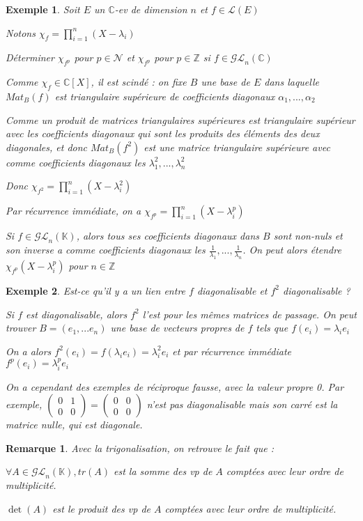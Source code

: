\documentclass[a4paper,12pt]{book}
\newtheorem{Exe}{Exemple}[section]
\newtheorem{Rem}{Remarque}[section]
\def\C{\mathbb{C}}
\def\Z{\mathbb{Z}}
\def\K{\mathbb{K}}
\begin{document}
\begin{Exe}
Soit $E$ un $\C$-ev de dimension $n$ et $f\in\mathcal{L}(E)$ \par Notons $\chi_f = \prod\limits_{i=1}^n (X-\lambda_i)$ \par Déterminer $\chi_{f^p}$ pour $p\in\mathcal{N}$ et $\chi_{f^p}$ pour $p\in\Z$ si $f\in\mathcal{GL}_n(\C)$ \par Comme $\chi_f\in\C[X]$, il est scindé : on fixe $B$ une base de $E$ dans laquelle $Mat_B(f)$ est triangulaire supérieure de coefficients diagonaux $\alpha_1,...,\alpha_2$ \par Comme un produit de matrices triangulaires supérieures est triangulaire supérieur avec les coefficients diagonaux qui sont les produits des éléments des deux diagonales, et donc $Mat_B(f^2)$ est une matrice triangulaire supérieure avec comme coefficients diagonaux les $\lambda_1^2,...,\lambda_n^2$
\par Donc $\chi_{f^2} = \prod\limits_{i=1}^n(X-\lambda_i^2)$ \par Par récurrence immédiate, on a $\chi_{f^p} = \prod\limits_{i=1}^n (X-\lambda_i^p)$ \par Si $f\in\mathcal{GL}_n(\K)$, alors tous ses coefficients diagonaux dans $B$ sont non-nuls et son inverse a comme coefficients diagonaux les $\frac{1}{\lambda_1},...,\frac{1}{\lambda_n}$. On peut alors étendre $\chi_{f^p}(X-\lambda_i^p)$ pour $n\in\Z$
\end{Exe}
\begin{Exe}
Est-ce qu'il y a un lien entre $f$ diagonalisable et $f^2$ diagonalisable ? \par Si $f$ est diagonalisable, alors $f^2$ l'est pour les mêmes matrices de passage. On peut trouver $B=(e_1,...e_n)$ une base de vecteurs propres de $f$ tels que $f(e_i)=\lambda_i e_i$ \par On a alors $f^2(e_i)=f(\lambda_i e_i) = \lambda_i^2e_i$ et par récurrence immédiate $f^p(e_i)=\lambda_i^pe_i$ \par On a cependant des exemples de réciproque fausse, avec la valeur propre 0. Par exemple, $\begin{pmatrix} 0 & 1 \\ 0 & 0 \end{pmatrix}= \begin{pmatrix} 0 & 0 \\ 0 & 0\end{pmatrix}$ n'est pas diagonalisable mais son carré est la matrice nulle, qui est diagonale.
\end{Exe}
\begin{Rem}
Avec la trigonalisation, on retrouve le fait que : \par $\forall A\in\mathcal{GL}_n(\K), tr(A)$ est la somme des vp de $A$ comptées avec leur ordre de multiplicité. \par $\det (A)$ est le produit des vp de $A$ comptées avec leur ordre de multiplicité.
\end{Rem}
\end{document}
